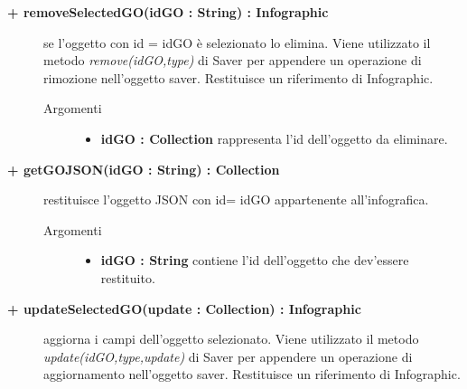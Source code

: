 \begin{description}
\begin{description}
\end{description}


\begin{description}
		\item[\textbf{\color{blue}+ removeSelectedGO(idGO : String) : Infographic			}] \hfill
			se l'oggetto con id = idGO è selezionato lo elimina. Viene utilizzato il metodo \textit{remove(idGO,type)} di Saver per appendere un operazione di rimozione nell'oggetto saver. Restituisce un riferimento di Infographic.

\begin{description}
			\item[Argomenti] \hfill
				\begin{itemize}
						\item \textbf{idGO : Collection			} \hfill
					rappresenta l'id dell'oggetto da eliminare.
				\end{itemize}

\end{description}

\end{description}

\begin{description}
		\item[\textbf{\color{blue}+ getGOJSON(idGO : String) : Collection			}] \hfill
			restituisce l'oggetto JSON con id= idGO appartenente all'infografica.   

\begin{description}
			\item[Argomenti] \hfill
				\begin{itemize}
						\item \textbf{idGO : String			} \hfill
					contiene l'id dell'oggetto che dev'essere restituito.
				\end{itemize}

\end{description}

\end{description}

\begin{description}
		\item[\textbf{\color{blue}+ updateSelectedGO(update : Collection) : Infographic			}] \hfill
			aggiorna i campi dell'oggetto selezionato. Viene utilizzato il metodo \textit{update(idGO,type,update)} di Saver per appendere un operazione di aggiornamento nell'oggetto saver. Restituisce un riferimento di Infographic.  


\end{description}
\end{description}
